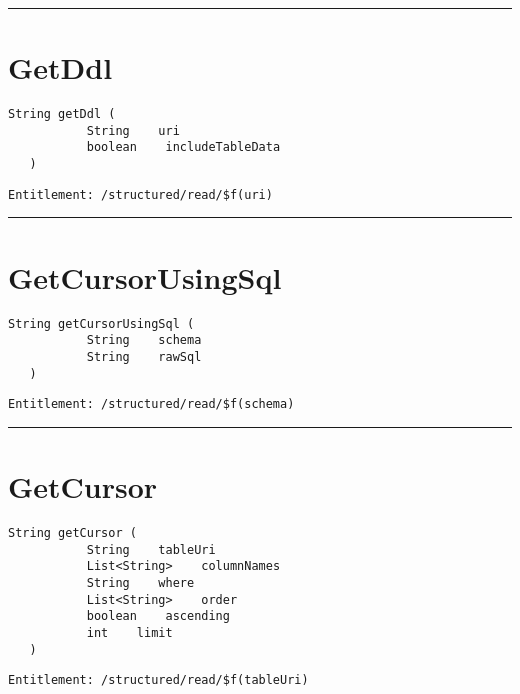 \rule{12cm}{2pt}
\section{GetDdl}
\label{Api:GetDdl}
\begin{lstlisting}[style=nonumbers]
   String getDdl (
           String    uri
           boolean    includeTableData
   )
\end{lstlisting}
\begin{Verbatim}[formatcom=\color{Maroon}]
  Entitlement: /structured/read/$f(uri)
\end{Verbatim}



\rule{12cm}{2pt}
\section{GetCursorUsingSql}
\label{Api:GetCursorUsingSql}
\begin{lstlisting}[style=nonumbers]
   String getCursorUsingSql (
           String    schema
           String    rawSql
   )
\end{lstlisting}
\begin{Verbatim}[formatcom=\color{Maroon}]
  Entitlement: /structured/read/$f(schema)
\end{Verbatim}



\rule{12cm}{2pt}
\section{GetCursor}
\label{Api:GetCursor}
\begin{lstlisting}[style=nonumbers]
   String getCursor (
           String    tableUri
           List<String>    columnNames
           String    where
           List<String>    order
           boolean    ascending
           int    limit
   )
\end{lstlisting}
\begin{Verbatim}[formatcom=\color{Maroon}]
  Entitlement: /structured/read/$f(tableUri)
\end{Verbatim}



